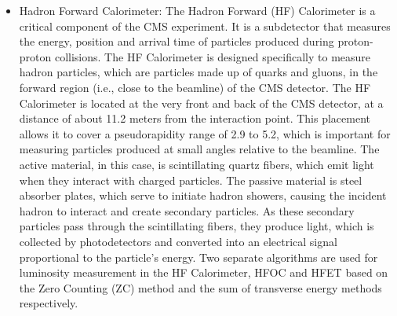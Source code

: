 \begin{itemize}
\item Hadron Forward Calorimeter: The Hadron Forward (HF) Calorimeter is a critical component of the CMS experiment. It is a subdetector that measures the energy, position and arrival time of particles produced during proton-proton collisions. The HF Calorimeter is designed specifically to measure hadron particles, which are particles made up of quarks and gluons, in the forward region (i.e., close to the beamline) of the CMS detector. The HF Calorimeter is located at the very front and back of the CMS detector, at a distance of about 11.2 meters from the interaction point. This placement allows it to cover a pseudorapidity range of 2.9 to 5.2, which is important for measuring particles produced at small angles relative to the beamline. %
The active material, in this case, is scintillating quartz fibers, which emit light when they interact with charged particles. The passive material is steel absorber plates, which serve to initiate hadron showers, causing the incident hadron to interact and create secondary particles. As these secondary particles pass through the scintillating fibers, they produce light, which is collected by photodetectors and converted into an electrical signal proportional to the particle's energy. Two separate algorithms are used for luminosity measurement in the HF Calorimeter, HFOC and HFET based on the Zero Counting (ZC) method and the sum of transverse energy methods respectively. %


\end{itemize}
